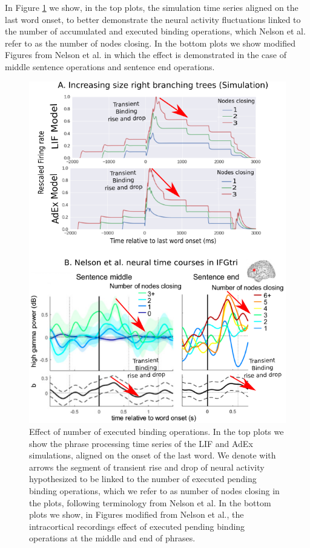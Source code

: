 \documentclass[10pt]{article}
\begin{document}
In Figure \ref{fig:ecog-2} we show, in the top plots, the simulation time series aligned on the last word onset, to better demonstrate the neural activity fluctuations linked to the number of accumulated and executed binding operations, which Nelson et al. refer to as the number of nodes closing.
In the bottom plots we show modified Figures from Nelson et al. in which the effect is demonstrated in the case of middle sentence operations and sentence end operations.


\begin{figure}[h!]
  \begin{center}
    \includegraphics[width=0.70\columnwidth]{figures/ecog_comparison_2.png}
    \caption{{Effect of number of executed binding operations.
        In the top plots we show the phrase processing time series of the LIF and AdEx simulations, aligned on the onset of the last word.
        We denote with arrows the segment of transient rise and drop of neural activity hypothesized to be linked to the number of executed pending binding operations, which we refer to as number of nodes closing in the plots, following terminology from Nelson et al.
        In the bottom plots we show, in Figures modified from Nelson et al., the intracortical recordings effect of executed pending binding operations at the middle and end of phrases.
     {\label{fig:ecog-2}}%
      }}
  \end{center}
\end{figure}
\end{document}
